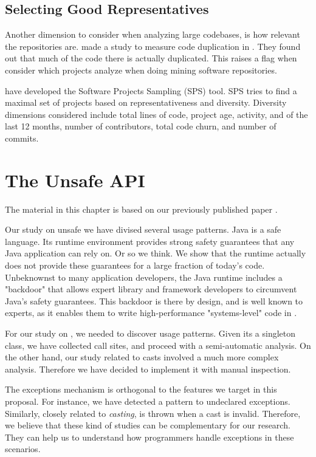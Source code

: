 \documentclass{usiinfdocprop}
\begin{document}
\section{Selecting Good Representatives \label{org0f368d7}}
\label{sec:org61fe495}
Another dimension to consider when analyzing large codebases, is how relevant the repositories are.
\cite{lopes_dejavu:_2017} made a study to measure code duplication in \github{}.
They found out that much of the code there is actually duplicated.
This raises a flag when consider which projects analyze when doing mining software repositories. 

\cite{nagappan_diversity_2013} have developed the Software Projects Sampling (SPS) tool.
SPS tries to find a maximal set of projects based on representativeness and diversity.
Diversity dimensions considered include total lines of code, project age, activity, and of the last 12 months, number of contributors, total code churn, and number of commits.

\chapter{The Unsafe API \label{orgd4a07ae}}
\label{sec:orgf182952}

The material in this chapter is based on our previously published paper \citep{mastrangelo_use_2015}.

Our study on unsafe we have divised several usage patterns.
Java is a safe language.
Its runtime environment provides strong safety guarantees that any Java application can rely on.
Or so we think.
We show that the runtime actually does not provide these guarantees for a large fraction of today's \java{} code.
Unbeknownst to many application developers, the Java runtime includes a "backdoor" that allows expert library and framework developers to circumvent Java's safety guarantees.
This backdoor is there by design, and is well known to experts, as it enables them to write high-performance "systems-level" code in \java{}.

For our study on \smu{}, we needed to discover usage patterns.
Given its a singleton class, we have collected call sites, and proceed with a semi-automatic analysis.
On the other hand, our study related to casts involved a much more complex analysis.
Therefore we have decided to implement it with manual inspection.

The exceptions mechanism is orthogonal to the features we target in this proposal.
For instance, we have detected a \smu{} pattern to \throw{} undeclared exceptions.
Similarly, closely related to \emph{casting}, \cce{} is thrown when a cast is invalid.
Therefore, we believe that these kind of studies can be complementary for our research.
They can help us to understand how programmers handle exceptions in these scenarios.
\end{document}
